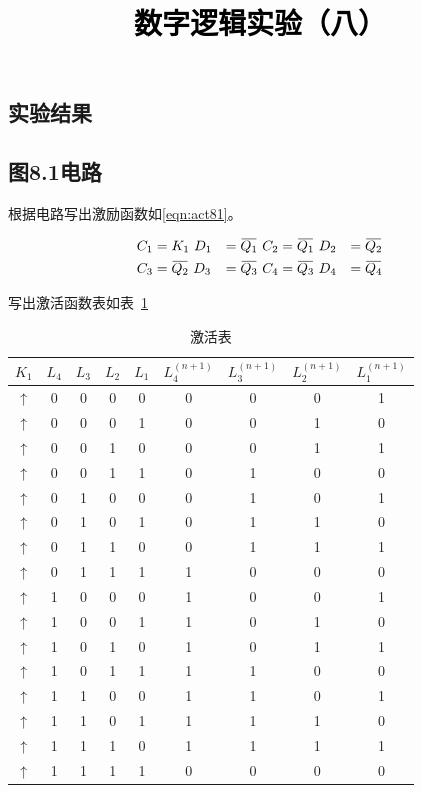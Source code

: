 \documentclass[a4paper,twoside]{ctexart}
\newcommand{\PaperTitle}{数字逻辑实验（八）}  %
\newcommand{\ols}[1]{\mskip.5\thinmuskip\overline{\mskip-.5\thinmuskip {#1} \mskip-.5\thinmuskip}\mskip.5\thinmuskip}
\begin{document}
\newpage

\title{
	\Large{\textcolor{black}{\PaperTitle}}
}
 
\newpage
\setcounter{page}{1}

\begin{spacing}{1.2}


\setcounter{section}{3}

\section{实验结果}

\subsection{图8.1电路}

根据电路写出激励函数如\eqref{eqn:act81}。

\begin{equation}
	\label{eqn:act81}
	\begin{aligned}
		C_1&=K_1 \
		D_1&=\ols{Q_1} \
		C_2&=\ols{Q_1} \
		D_2&=\ols{Q_2}\\
		C_3&=\ols{Q_2}\
		D_3&=\ols{Q_3}\
		C_4&=\ols{Q_3}\
		D_4&=\ols{Q_4}
	\end{aligned}
\end{equation}

写出激活函数表如表~\ref{tbl:act81}

\begin{table}[htb]
	\centering
	\caption{激活表}
	\label{tbl:act81}
	\begin{tabular}{c|cccc|cccc}
		\toprule
		\hline
		$K_1$&$L_4$&$L_3$&$L_2$&$L_1$&$L_4^{(n+1)}$&$L_3^{(n+1)}$&$L_2^{(n+1)}$&$L_1^{(n+1)}$ \\
		\hline
		$\uparrow$&0&0&0&0&0&0&0&1\\
		$\uparrow$&0&0&0&1&0&0&1&0\\
		$\uparrow$&0&0&1&0&0&0&1&1\\
		$\uparrow$&0&0&1&1&0&1&0&0\\
		$\uparrow$&0&1&0&0&0&1&0&1\\
		$\uparrow$&0&1&0&1&0&1&1&0\\
		$\uparrow$&0&1&1&0&0&1&1&1\\
		$\uparrow$&0&1&1&1&1&0&0&0\\
		$\uparrow$&1&0&0&0&1&0&0&1\\
		$\uparrow$&1&0&0&1&1&0&1&0\\
		$\uparrow$&1&0&1&0&1&0&1&1\\
		$\uparrow$&1&0&1&1&1&1&0&0\\
		$\uparrow$&1&1&0&0&1&1&0&1\\
		$\uparrow$&1&1&0&1&1&1&1&0\\
		$\uparrow$&1&1&1&0&1&1&1&1\\
		$\uparrow$&1&1&1&1&0&0&0&0\\
		\hline
		\bottomrule
		

\end{tabular}
\end{table}
\end{spacing}
\end{document}
